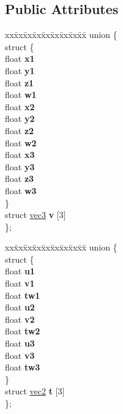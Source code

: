 \subsection*{Public Attributes}
\begin{DoxyCompactItemize}
\item 
\mbox{\label{structtriangle_a5bc62f2a81704e89e77d3b9b54c34be2}} 
\begin{tabbing}
xx\=xx\=xx\=xx\=xx\=xx\=xx\=xx\=xx\=\kill
union \{\\
\mbox{\label{uniontriangle_1_1_0D8_a54d0d098812b0da9651917ea3402d139}} 
\>struct \{\\
\>\>float {\bfseries x1}\\
\>\>float {\bfseries y1}\\
\>\>float {\bfseries z1}\\
\>\>float {\bfseries w1}\\
\>\>float {\bfseries x2}\\
\>\>float {\bfseries y2}\\
\>\>float {\bfseries z2}\\
\>\>float {\bfseries w2}\\
\>\>float {\bfseries x3}\\
\>\>float {\bfseries y3}\\
\>\>float {\bfseries z3}\\
\>\>float {\bfseries w3}\\
\>\} \\
\>struct \hyperlink{structvec3}{vec3} {\bfseries v} \mbox{[}3\mbox{]}\\
\}; \\

\end{tabbing}\item 
\mbox{\label{structtriangle_a21313e1a3507db1c3028ddb1bc186b28}} 
\begin{tabbing}
xx\=xx\=xx\=xx\=xx\=xx\=xx\=xx\=xx\=\kill
union \{\\
\mbox{\label{uniontriangle_1_1_0D10_a12bac64045f3bf8e23abf4c84ba5110c}} 
\>struct \{\\
\>\>float {\bfseries u1}\\
\>\>float {\bfseries v1}\\
\>\>float {\bfseries tw1}\\
\>\>float {\bfseries u2}\\
\>\>float {\bfseries v2}\\
\>\>float {\bfseries tw2}\\
\>\>float {\bfseries u3}\\
\>\>float {\bfseries v3}\\
\>\>float {\bfseries tw3}\\
\>\} \\
\>struct \hyperlink{structvec2}{vec2} {\bfseries t} \mbox{[}3\mbox{]}\\
\}; \\


\end{tabbing}
\end{DoxyCompactItemize}
